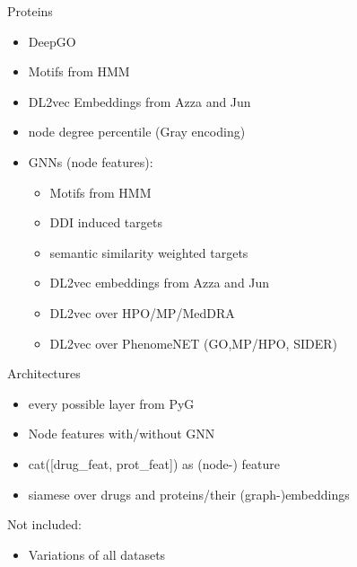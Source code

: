 \documentclass[10pt]{beamer}
\begin{document}
\begin{frame}{Proteins}
	\begin{itemize}
		\item DeepGO
		\item Motifs from HMM
		\item DL2vec Embeddings from Azza and Jun
		\item node degree percentile (Gray encoding)
		\item GNNs (node features):
		\begin{itemize}
			\item Motifs from HMM
			\item DDI induced targets
			\item semantic similarity weighted targets
			\item DL2vec embeddings from Azza and Jun
			\item DL2vec over HPO/MP/MedDRA
			\item DL2vec over PhenomeNET (GO,MP/HPO, SIDER)
		\end{itemize}
	\end{itemize}
\end{frame}

\begin{frame}{Architectures}
	\begin{itemize}
		\item every possible layer from PyG
		\item Node features with/without GNN
		\item cat([drug\_feat, prot\_feat]) as (node-) feature
		\item siamese over drugs and proteins/their (graph-)embeddings
	\end{itemize}
	\pause 
	Not included:
	\begin{itemize}
		\item Variations of all datasets
	\end{itemize}
\end{frame}
\end{document}
